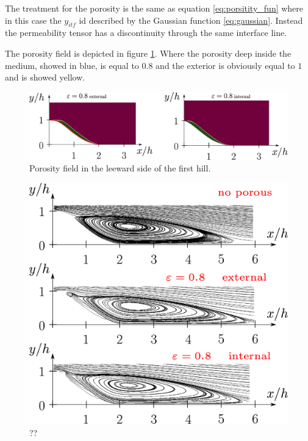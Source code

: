 The treatment for the porosity is the same as equation \eqref{eq:porsitity_fun} where in this case the $y_{itf}$ id described by the Gaussian function \eqref{eq:gaussian}.
Instead the permeability tensor has a discontinuity through the same interface line.

The porosity field is depicted in figure \ref{fig:por_gauss}. Where the porosity deep inside the medium, showed in blue, is equal to $0.8$ and the exterior is obviously equal to $1$ and is showed yellow.

\begin{figure}[h]
\centering
\includegraphics[width=0.9\linewidth]{chapter_5/figure/por}
\caption{Porosity field in the leeward side of the first hill.}
\label{fig:por_gauss}
\end{figure}


\begin{figure}[h]
	\centering
	\includegraphics[width=1\linewidth]{chapter_5/figure/streamlines}
	\caption{??}
	\label{fig:streamlines}
\end{figure}

